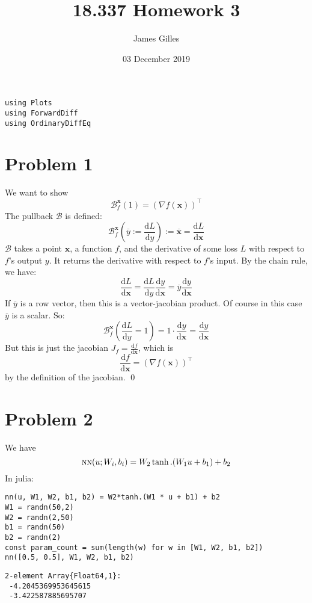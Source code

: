 \documentclass[11pt]{article}
\author{James Gilles}
\date{03 December 2019}
\title{18.337 Homework 3}
\newcommand{\B}[0]{\mathcal{B}}
\newcommand{\xv}[0]{\mathbf{x}}
\newcommand*\lgrad[1]{\overline{#1}}
\newcommand*\tderiv[2]{\frac{\mathrm{d}#1}{\mathrm{d}#2}}
\newcommand{\NN}[0]{\textsc{nn}}
\newcommand{\transpose}[1]{#1 ^\top}
\renewcommand*{\tableofcontents}[0]{}
\begin{document}
\maketitle
\tableofcontents

\begin{verbatim}
using Plots
using ForwardDiff
using OrdinaryDiffEq
\end{verbatim}

\section{Problem 1}
\label{sec:orgd95268d}
We want to show
$$\B_f^\xv(1) = \transpose{(\nabla f(\xv))}$$
The pullback \(\B\) is defined:
$$\B^\xv_f(\lgrad{y} := \tderiv{L}{y}) := \lgrad{\xv} = \tderiv{L}{\xv}$$
\(\B\) takes a point \(\xv\), a function \(f\), and the derivative of some loss \(L\) with respect to \(f\)'s output \(y\).
It returns the derivative with respect to \(f\)'s input.
By the chain rule, we have:
$$\tderiv{L}{\xv} = \tderiv{L}{y}\tderiv{y}{\xv} = \lgrad{y} \tderiv{y}{\xv}$$
If \(\lgrad{y}\) is a row vector, then this is a vector-jacobian product. Of course in this case \(\lgrad{y}\) is a scalar.
So:
$$\B^\xv_f(\tderiv{L}{y} = 1) = 1 \cdot \tderiv{y}{\xv} = \tderiv{y}{\xv}$$
But this is just the jacobian \(J_f=\tderiv{f}{\xv}\), which is
$$\tderiv{f}{\xv}=\transpose{(\nabla f(\xv))}$$
by the definition of the jacobian. \qed
\section{Problem 2}
\label{sec:org4c14672}
We have $$\NN(u; W_i, b_i) = W_2 \tanh.(W_1 u + b_1) + b_2$$
In julia:
\begin{verbatim}
nn(u, W1, W2, b1, b2) = W2*tanh.(W1 * u + b1) + b2
W1 = randn(50,2)
W2 = randn(2,50)
b1 = randn(50)
b2 = randn(2)
const param_count = sum(length(w) for w in [W1, W2, b1, b2])
nn([0.5, 0.5], W1, W2, b1, b2)
\end{verbatim}

\begin{verbatim}
2-element Array{Float64,1}:
 -4.2045369953645615
 -3.422587885695707 
\end{verbatim}
\end{document}
